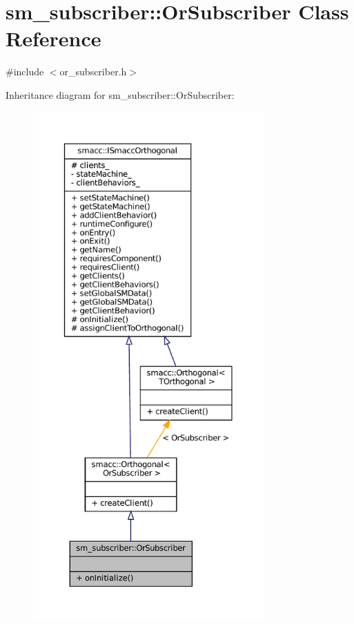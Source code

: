 \hypertarget{classsm__subscriber_1_1OrSubscriber}{}\section{sm\+\_\+subscriber\+:\+:Or\+Subscriber Class Reference}
\label{classsm__subscriber_1_1OrSubscriber}


{\ttfamily \#include $<$or\+\_\+subscriber.\+h$>$}



Inheritance diagram for sm\+\_\+subscriber\+:\+:Or\+Subscriber\+:
\nopagebreak
\begin{figure}[H]
\begin{center}
\leavevmode
\includegraphics[height=550pt]{classsm__subscriber_1_1OrSubscriber__inherit__graph}
\end{center}
\end{figure}


